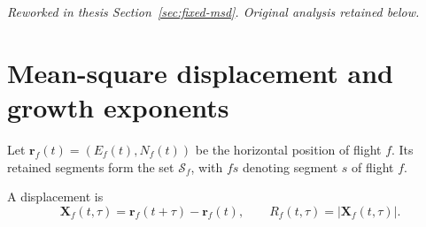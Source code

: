 \FloatBarrier
\begingroup\color{red!70!black}
\noindent\textit{Reworked in thesis Section~\ref{sec:fixed-msd}. Original analysis retained below.}\par
\section{Mean-square displacement and growth exponents}
\label{sec:estimator}
\label{sec:obs-global}

Let $\mathbf r_f(t)=(E_f(t),N_f(t))$ be the horizontal position of flight $f$.
Its retained segments form the set $\mathcal S_f$, with $fs$ denoting segment $s$
of flight $f$.

A displacement is
\begin{equation}
  \mathbf X_f(t,\tau)=\mathbf r_f(t+\tau)-\mathbf r_f(t),
  \qquad R_f(t,\tau)=|\mathbf X_f(t,\tau)|.
  \label{eq:displacement-global}
\end{equation}

